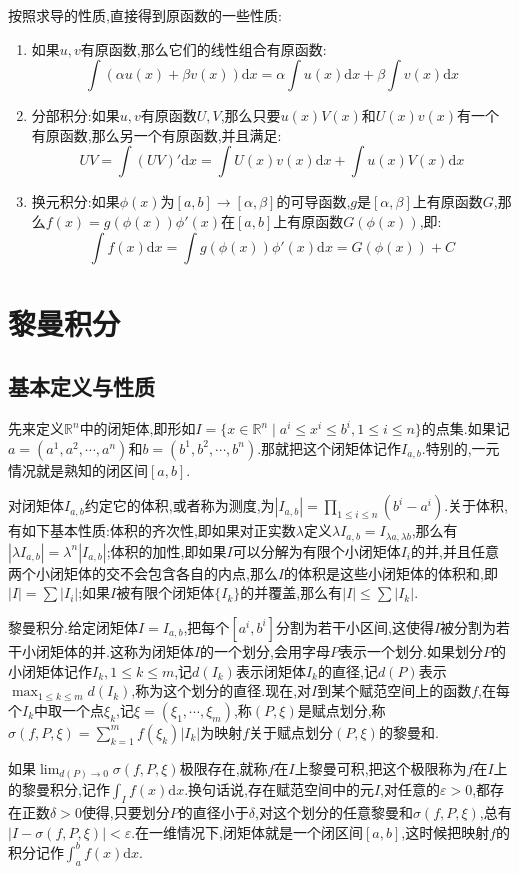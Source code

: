 按照求导的性质,直接得到原函数的一些性质:
\begin{enumerate}
	\item 如果$u,v$有原函数,那么它们的线性组合有原函数:
	$$\int\left(\alpha u(x)+\beta v(x)\right)\mathrm{d}x=\alpha\int u(x)\mathrm{d}x+\beta\int v(x)\mathrm{d}x$$
	\item 分部积分:如果$u,v$有原函数$U,V$,那么只要$u(x)V(x)$和$U(x)v(x)$有一个有原函数,那么另一个有原函数,并且满足:
	$$UV=\int(UV)'\mathrm{d}x=\int U(x)v(x)\mathrm{d}x+\int u(x)V(x)\mathrm{d}x$$
	\item 换元积分:如果$\phi(x)$为$[a,b]\to[\alpha,\beta]$的可导函数,$g$是$[\alpha,\beta]$上有原函数$G$,那么$f(x)=g(\phi(x))\phi'(x)$在$[a,b]$上有原函数$G(\phi(x))$,即:
	$$\int f(x)\mathrm{d}x=\int g(\phi(x))\phi'(x)\mathrm{d}x=G(\phi(x))+C$$
\end{enumerate}
\newpage
\section{黎曼积分}
\subsection{基本定义与性质}

先来定义$\mathbb{R}^n$中的闭矩体,即形如$I=\{x\in\mathbb{R}^n\mid a^i\le x^i\le b^i,1\le i\le n\}$的点集.如果记$a=(a^1,a^2,\cdots,a^n)$和$b=(b^1,b^2,\cdots,b^n)$.那就把这个闭矩体记作$I_{a,b}$.特别的,一元情况就是熟知的闭区间$[a,b]$.

对闭矩体$I_{a,b}$约定它的体积,或者称为测度,为$|I_{a,b}|=\prod_{1\le i\le n}(b^i-a^i)$.关于体积,有如下基本性质:体积的齐次性,即如果对正实数$\lambda$定义$\lambda I_{a,b}=I_{\lambda a,\lambda b}$,那么有$|\lambda I_{a,b}|=\lambda^n|I_{a,b}|$;体积的加性,即如果$I$可以分解为有限个小闭矩体$I_i$的并,并且任意两个小闭矩体的交不会包含各自的内点,那么$I$的体积是这些小闭矩体的体积和,即$|I|=\sum|I_i|$;如果$I$被有限个闭矩体$\{I_k\}$的并覆盖,那么有$|I|\le\sum|I_k|$.

黎曼积分.给定闭矩体$I=I_{a,b}$,把每个$[a^i,b^i]$分割为若干小区间,这使得$I$被分割为若干小闭矩体的并.这称为闭矩体$I$的一个划分,会用字母$P$表示一个划分.如果划分$P$的小闭矩体记作$I_k,1\le k\le m$,记$d(I_k)$表示闭矩体$I_k$的直径,记$d(P)$表示$\max_{1\le k\le m}d(I_k)$,称为这个划分的直径.现在,对$I$到某个赋范空间上的函数$f$,在每个$I_k$中取一个点$\xi_k$,记$\xi=(\xi_1,\cdots,\xi_m)$,称$(P,\xi)$是赋点划分,称$\sigma(f,P,\xi)=\sum_{k=1}^{m}f(\xi_k)|I_k|$为映射$f$关于赋点划分$(P,\xi)$的黎曼和.

如果$\lim_{d(P)\to0}\sigma(f,P,\xi)$极限存在,就称$f$在$I$上黎曼可积,把这个极限称为$f$在$I$上的黎曼积分,记作$\int_If(x)\mathrm{d}x$.换句话说,存在赋范空间中的元$I$,对任意的$\varepsilon>0$,都存在正数$\delta>0$使得,只要划分$P$的直径小于$\delta$,对这个划分的任意黎曼和$\sigma(f,P,\xi)$,总有$\left|I-\sigma(f,P,\xi)\right|<\varepsilon$.在一维情况下,闭矩体就是一个闭区间$[a,b]$,这时候把映射$f$的积分记作$\int_a^bf(x)\mathrm{d}x$.

